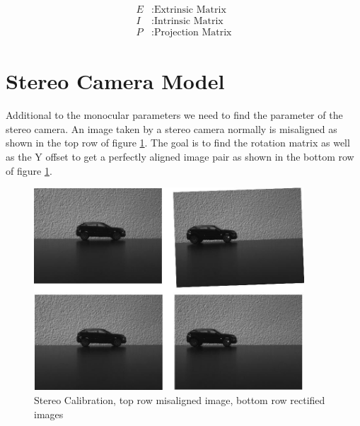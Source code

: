 \documentclass[11pt,a4paper,titlepage,oneside]{report}
\begin{document}
\begin{align*}
	E		&: \text{Extrinsic Matrix}\\
	I		&: \text{Intrinsic Matrix}\\
	P		&: \text{Projection Matrix}
\end{align*}

\section{Stereo Camera Model}

Additional to the monocular parameters we need to find the parameter of the stereo camera. An image taken by a stereo camera normally is misaligned as shown in the top row of figure \ref{fig:stereo_calib}. The goal is to find the rotation matrix as well as the Y offset to get a perfectly aligned image pair as shown in the bottom row of figure \ref{fig:stereo_calib}.

\begin{figure}[H]
  \begin{center}
		\includegraphics[width=0.9\textwidth]{img/car_calib.jpg}
  \end{center}
	\caption{Stereo Calibration, top row misaligned image, bottom row rectified images}\label{fig:stereo_calib}
\end{figure}
\end{document}

